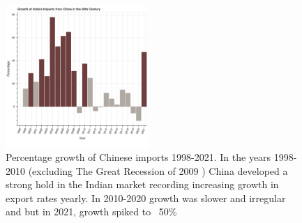 \documentclass{article}
\begin{document}
\begin{figure}[h]
    \centering
    \includegraphics[width=0.48\textwidth]{ind_chn_imports.png} %
    \captionsetup{skip=0pt,font=small} %
    \caption{Percentage growth of Chinese imports 1998-2021. In the years 1998-2010 (excluding The Great Recession of 2009 ) China developed a strong hold in the Indian market recording increasing growth in export rates yearly. In 2010-2020 growth was slower and irregular and but in 2021, growth spiked to ~50\%}
\end{figure}
\end{document}

